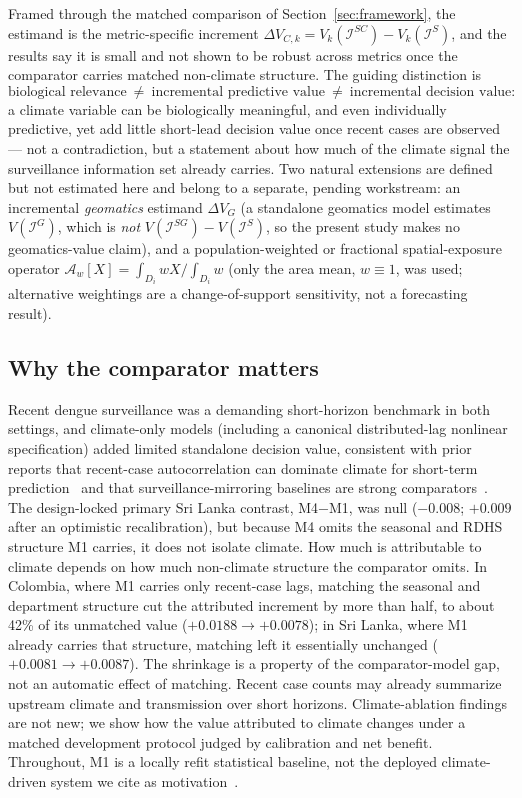 \documentclass[11pt,a4paper]{article}
\begin{document}
Framed through the matched comparison of Section~\ref{sec:framework}, the estimand is the metric-specific increment $\Delta V_{C,k}=V_k(\mathcal I^{SC})-V_k(\mathcal I^{S})$, and the results say it is small and not shown to be robust across metrics once the comparator carries matched non-climate structure. The guiding distinction is
\[
\text{biological relevance}\ \neq\ \text{incremental predictive value}\ \neq\ \text{incremental decision value}:
\]
a climate variable can be biologically meaningful, and even individually predictive, yet add little short-lead decision value once recent cases are observed --- not a contradiction, but a statement about how much of the climate signal the surveillance information set already carries. Two natural extensions are defined but not estimated here and belong to a separate, pending workstream: an incremental \emph{geomatics} estimand $\Delta V_{G}$ (a standalone geomatics model estimates $V(\mathcal I^{G})$, which is \emph{not} $V(\mathcal I^{SG})-V(\mathcal I^{S})$, so the present study makes no geomatics-value claim), and a population-weighted or fractional spatial-exposure operator $\mathcal A_w[X]=\int_{D_i}wX/\int_{D_i}w$ (only the area mean, $w{\equiv}1$, was used; alternative weightings are a change-of-support sensitivity, not a forecasting result).

\subsection*{Why the comparator matters}
Recent dengue surveillance was a demanding short-horizon benchmark in both settings, and climate-only models (including a canonical distributed-lag nonlinear specification) added limited standalone decision value, consistent with prior reports that recent-case autocorrelation can dominate climate for short-term prediction~\cite{Johansson2016,Benedum2020,Sesay2026} and that surveillance-mirroring baselines are strong comparators~\cite{Lowe2013}. The design-locked primary Sri Lanka contrast, M4$-$M1, was null ($-0.008$; $+0.009$ after an optimistic recalibration), but because M4 omits the seasonal and RDHS structure M1 carries, it does not isolate climate. How much is attributable to climate depends on how much non-climate structure the comparator omits. In Colombia, where M1 carries only recent-case lags, matching the seasonal and department structure cut the attributed increment by more than half, to about 42\% of its unmatched value ($+0.0188 \to +0.0078$); in Sri Lanka, where M1 already carries that structure, matching left it essentially unchanged ($+0.0081 \to +0.0087$). The shrinkage is a property of the comparator-model gap, not an automatic effect of matching. Recent case counts may already summarize upstream climate and transmission over short horizons. Climate-ablation findings are not new; we show how the value attributed to climate changes under a matched development protocol judged by calibration and net benefit. Throughout, M1 is a locally refit statistical baseline, not the deployed climate-driven system we cite as motivation~\cite{EWARScsd}.
\end{document}
